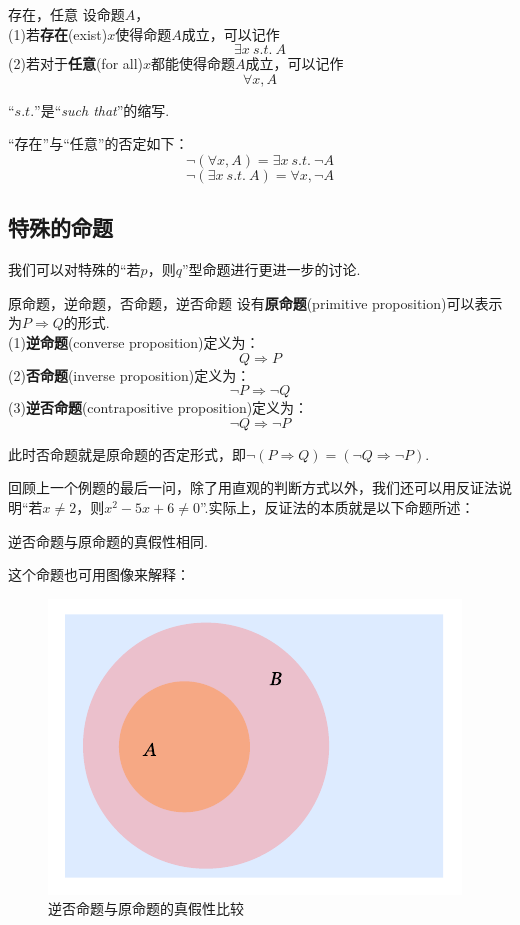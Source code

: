 \documentclass[lang=cn, zihao=4.5]{elegantbook}
\begin{document}
\begin{definition}{存在，任意}
	设命题$A$， \\
	(1)若\textbf{存在}(exist)$x$使得命题$A$成立，可以记作$$\exists x~s.t.~A$$
	(2)若对于\textbf{任意}(for all)$x$都能使得命题$A$成立，可以记作$$\forall x,A$$
\end{definition}
\begin{remark}
	“$s.t.$”是“\textit{such that}”的缩写.
\end{remark}
\begin{remark}
	“存在”与“任意”的否定如下：
	$$\neg (\forall x,A) = \exists x~s.t.~\neg A$$
	$$\neg (\exists x~s.t.~A) = \forall x,\neg A$$
\end{remark}

\subsection{特殊的命题}

我们可以对特殊的“若$p$，则$q$”型命题进行更进一步的讨论.

\begin{definition}{原命题，逆命题，否命题，逆否命题}
	设有\textbf{原命题}(primitive proposition)可以表示为$P \Rightarrow Q$的形式. \\
	(1)\textbf{逆命题}(converse proposition)定义为：$$Q \Rightarrow P$$
	(2)\textbf{否命题}(inverse proposition)定义为：$$\neg P \Rightarrow \neg Q$$
	(3)\textbf{逆否命题}(contrapositive proposition)定义为：$$\neg Q \Rightarrow \neg P$$
\end{definition}
\begin{remark}
	此时否命题就是原命题的否定形式，即$\neg (P \Rightarrow Q) = (\neg Q \Rightarrow \neg P)$.
\end{remark}

回顾上一个例题的最后一问，除了用直观的判断方式以外，我们还可以用反证法说明“若$x \neq 2$，则$x^2-5x+6 \neq 0$”.实际上，反证法的本质就是以下命题所述：

\begin{proposition}
	逆否命题与原命题的真假性相同.
\end{proposition}

这个命题也可用图像来解释：

\begin{figure}[h!]
	\centering
	\includegraphics{attachment/202302192.pdf}
	\caption{逆否命题与原命题的真假性比较}
\end{figure}
\end{document}
